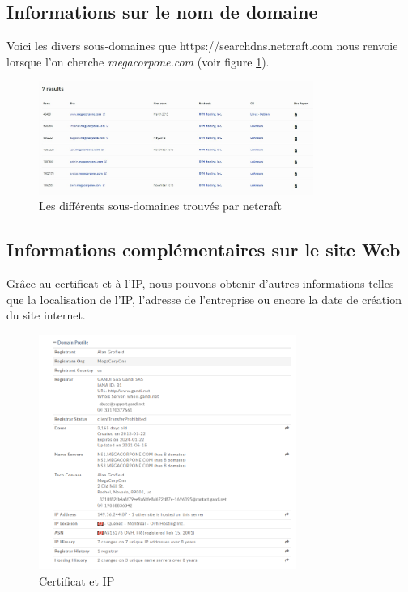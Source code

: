 \documentclass[a4paper]{article}
\begin{document}
\subsection{Informations sur le nom de domaine}
Voici les divers sous-domaines que https://searchdns.netcraft.com nous renvoie lorsque l'on cherche \emph{megacorpone.com} (voir figure \ref{fig:subdomain}).

\begin{figure}[H]
    \centering
    \includegraphics[width=0.80\textwidth]{images/lab1/subdomain.jpg}
    \caption{Les différents sous-domaines trouvés par netcraft}
    \label{fig:subdomain}
\end{figure}

\subsection{Informations complémentaires sur le site Web}
Grâce au certificat et à l'IP, nous pouvons obtenir d'autres informations telles que la localisation de l'IP, l'adresse de l'entreprise ou encore la date de création du site internet.
\begin{figure}[H]
    \centering
    \includegraphics[width=0.75\textwidth]{images/lab1/certificat.png}
    \caption{Certificat et IP}
    \label{fig:certificat}
\end{figure}
\end{document}
